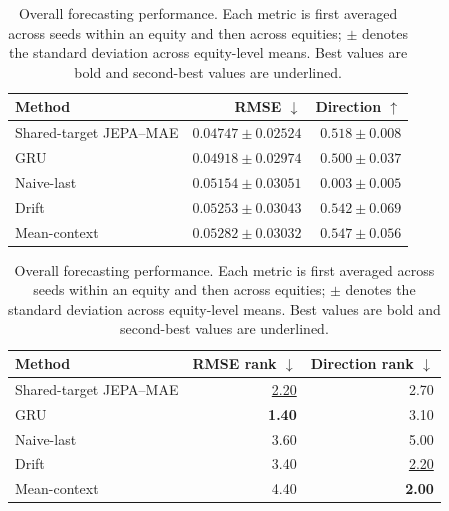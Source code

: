 \begin{table}[t]
\centering
\small
\caption{Overall forecasting performance. Each metric is first averaged across seeds within an equity and then across equities; $\pm$ denotes the standard deviation across equity-level means. Best values are bold and second-best values are underlined.}
\label{tab:main_metrics}
\begin{tabular}{lrr}
\toprule
Method & RMSE $\downarrow$ & Direction $\uparrow$ \\
\midrule
Shared-target JEPA--MAE & \textbf{$0.04747 \pm 0.02524$} & $0.518 \pm 0.008$ \\
GRU & \underline{$0.04918 \pm 0.02974$} & $0.500 \pm 0.037$ \\
Naive-last & $0.05154 \pm 0.03051$ & $0.003 \pm 0.005$ \\
Drift & $0.05253 \pm 0.03043$ & \underline{$0.542 \pm 0.069$} \\
Mean-context & $0.05282 \pm 0.03032$ & \textbf{$0.547 \pm 0.056$} \\
\bottomrule
\end{tabular}
\par\medskip
\begin{tabular}{lrr}
\toprule
Method & RMSE rank $\downarrow$ & Direction rank $\downarrow$ \\
\midrule
Shared-target JEPA--MAE & \underline{2.20} & 2.70 \\
GRU & \textbf{1.40} & 3.10 \\
Naive-last & 3.60 & 5.00 \\
Drift & 3.40 & \underline{2.20} \\
Mean-context & 4.40 & \textbf{2.00} \\
\bottomrule
\end{tabular}
\end{table}
